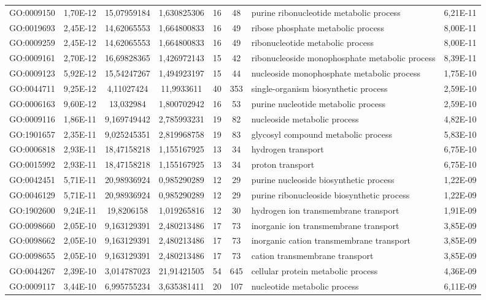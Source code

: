 \documentclass[12pt, a4paper]{report}
\begin{document}
\begin{table}[H]
\begin{tabular}{c|c|c|c|c|c|p{4cm}|c}
GO:0009150&	1,70E-12&	15,07959184&	1,630825306&	16&	48&	purine ribonucleotide metabolic process&	6,21E-11\\
GO:0019693&	2,45E-12&	14,62065553&	1,664800833&	16&	49&	ribose phosphate metabolic process&	8,00E-11\\
GO:0009259&	2,45E-12&	14,62065553&	1,664800833&	16&	49&	ribonucleotide metabolic process&	8,00E-11\\
GO:0009161&	2,70E-12&	16,69828365&	1,426972143&	15&	42&	ribonucleoside monophosphate metabolic process&	8,39E-11\\
GO:0009123&	5,92E-12&	15,54247267&	1,494923197&	15&	44&	nucleoside monophosphate metabolic process&	1,75E-10\\
GO:0044711&	9,25E-12&	4,11027424&	11,9933611&	40&	353&	single-organism biosynthetic process&	2,59E-10\\
GO:0006163&	9,60E-12&	13,032984&	1,800702942&	16&	53&	purine nucleotide metabolic process&	2,59E-10\\
GO:0009116&	1,86E-11&	9,169749442&	2,785993231&	19&	82&	nucleoside metabolic process&	4,82E-10\\
GO:1901657&	2,35E-11&	9,025245351&	2,819968758&	19&	83&	glycosyl compound metabolic process&	5,83E-10\\
GO:0006818&	2,93E-11&	18,47158218&	1,155167925&	13&	34&	hydrogen transport&	6,75E-10\\
GO:0015992&	2,93E-11&	18,47158218&	1,155167925&	13&	34&	proton transport&	6,75E-10\\
GO:0042451&	5,71E-11&	20,98936924&	0,985290289&	12&	29&	purine nucleoside biosynthetic process&	1,22E-09\\
GO:0046129&	5,71E-11&	20,98936924&	0,985290289&	12&	29&	purine ribonucleoside biosynthetic process&	1,22E-09\\
GO:1902600&	9,24E-11&	19,8206158&	1,019265816&	12&	30&	hydrogen ion transmembrane transport&	1,91E-09\\
GO:0098660&	2,05E-10&	9,163129391&	2,480213486&	17&	73&	inorganic ion transmembrane transport&	3,85E-09\\
GO:0098662&	2,05E-10&	9,163129391&	2,480213486&	17&	73&	inorganic cation transmembrane transport&	3,85E-09\\
GO:0098655&	2,05E-10&	9,163129391&	2,480213486&	17&	73&	cation transmembrane transport&	3,85E-09\\
GO:0044267&	2,39E-10&	3,014787023&	21,91421505&	54&	645&	cellular protein metabolic process&	4,36E-09\\
GO:0009117&	3,44E-10&	6,995755234&	3,635381411&	20&	107&	nucleotide metabolic process&	6,11E-09\\

\end{tabular}
\end{table}
\end{document}
